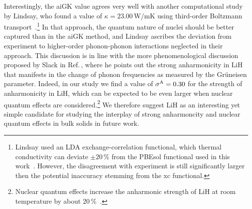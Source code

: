 Interestingly, the aiGK value agrees very well with another computational study by Lindsay, who found a value of $\kappa = 23.00$\,W/mK using third-order Boltzmann transport~\cite{Lindsay.2016}.\footnote{Lindsay used an LDA exchange-correlation functional, which thermal conductivity can deviate $\pm 20\,\%$ from the PBEsol functional used in this work~\cite{Carbogno.2016}. However, the disagreement with experiment is still significantly larger then the potential inaccuracy stemming from the xc functional.} In that approach, the quantum nature of nuclei should be better captured than in the aiGK method, and Lindsay ascribes the deviation from experiment to higher-order phonon-phonon interactions neglected in their approach. This discussion is in line with the more phenomenological discussion proposed by Slack in Ref.\,\cite{Slack.1973}, where he points out the strong anharmonicity in LiH that manifests in the change of phonon frequencies as measured by the Gr\"uneisen parameter. Indeed, in our study we find a value of $\sigma^\mathrm{A} = 0.30$ for the strength of anharmonicity in LiH, which can be expected to be even larger when nuclear quantum effects are considered.\footnote{Nuclear quantum effects increase the anharmonic strength of LiH at room temperature by about 20\,\%~\cite{hengst1}.} We therefore suggest LiH as an interesting yet simple candidate for studying the interplay of strong anharmoncity and nuclear quantum effects in bulk solids in future work.

